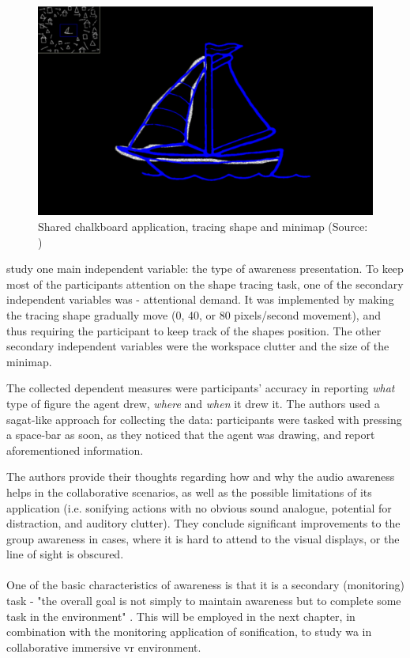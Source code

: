 \begin{figure}
	\centering
	\includegraphics[width=0.7\linewidth]{figures/gutwin_chalk_2011}
	\caption{Shared chalkboard application, tracing shape and minimap (Source: \parencite{gutwin_chalk_2011})}
	\label{fig:gutwinchalk2011}
\end{figure}


\parencite{gutwin_chalk_2011} study one main independent variable: the type of awareness presentation. To keep most of the participants attention on the shape tracing task, one of the secondary independent variables was - attentional demand. It was implemented by making the tracing shape gradually move (0, 40, or 80 pixels/second movement), and thus requiring the participant to keep track of the shapes position. The other secondary independent variables were the workspace clutter and the size of the minimap.

The collected dependent measures were participants' accuracy in reporting \textit{what }type of figure the agent drew, \textit{where }and \textit{when }it drew it.
The authors used a \gls{sagat}-like approach for collecting the data: participants were tasked with pressing a space-bar as soon, as they noticed that the agent was drawing, and report aforementioned information.

The authors provide their thoughts regarding how and why the audio awareness helps in the collaborative scenarios, as well as the possible limitations of its application (i.e. sonifying actions with no obvious sound analogue, potential for distraction, and auditory clutter). They conclude significant improvements to the group awareness in cases, where it is hard to attend to the visual displays, or the line of sight is obscured.


\paragraph[Bridge to experiments]{}
One of the basic characteristics of awareness is that it is a secondary (monitoring) task - "the overall goal is not simply to maintain awareness but to complete some task in the environment" \parencite{gutwin_descriptive_2002}. This will be employed in the next chapter, in combination with the monitoring application of sonification, to study \gls{wa} in collaborative immersive \gls{vr} environment.